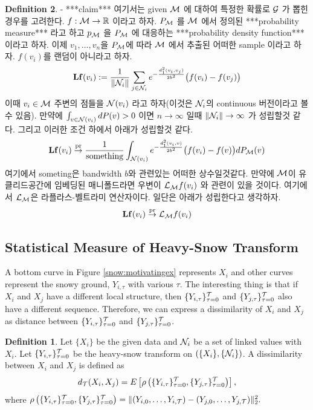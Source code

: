 \documentclass[preprint, review, 12pt]{article}
\theoremstyle{definition}
\newtheorem{dfn}{Definition}
\theoremstyle{remark}
\begin{document}
\begin{dfn}
- ***claim*** 여기서는 given ${\cal M}$ 에 대하여 특정한 확률로 ${\cal G}$ 가 뽑힌 경우를 고려한다. $f:{\cal M} \to \mathbb{R}$ 이라고 하자. $P_{\cal M}$ 를 ${\cal M}$ 에서 정의된 ***probability measure*** 라고 하고 $p_{\cal M}$ 을 $P_{\cal M}$ 에 대응하는 ***probability density function*** 이라고 하자. 이제 $v_1,\dots,v_n$을 $P_{\cal M}$에 따라 ${\cal M}$ 에서 추출된 어떠한 sample 이라고 하자. $f(v_i)$를  랜덤이 아니라고 하자. 
\begin{align}
{\bf Lf}(v_i):=\frac{1}{\|{\cal N}_ i\|}\sum_{j \in {\cal N}_ i} e^{ -\frac{d_1^2(v_i,v_j)}{2b^2} } \big(f(v_i)-f(v_j)\big)
\end{align}
이때 $v_i \in {\cal M}$ 주변의 점들을 ${\cal N}(v_i)$ 라고 하자(이것은 ${\cal N}_ i$의 continuous 버전이라고 볼 수 있음). 만약에 $\int_{v \in {\cal N}(v_i)} dP(v)>0$ 이면 $n \to \infty$ 일때 $\|{\cal N}_ i \| \to \infty$ 가 성립할것 같다.
그리고 이러한 조건 하에서 아래가 성립할것 같다. 
\begin{align}
{\bf Lf}(v_i) \overset{\operatorname{pr}}{\rightarrow}\frac{1}{\mbox{something} }\int_{ {\cal N}(v_i)} e^{ -\frac{d_1^2(v_i,v)}{2b^2} } \big(f(v_i)-f(v)\big)dP_{\cal M}(v)
\end{align}
여기에서 someting은 bandwidth $b$와 관련있는 어떠한 상수일것같다. 만약에 ${\cal M}$이 유클리드공간에 임베딩된 매니폴드라면 우변이 ${\cal L}_ {\cal M}f(v_i)$ 와 관련이 있을 것이다. 여기에서 ${\cal L}_ {\cal M}$은 라플라스-벨트라미 연산자이다. 일단은 아래가 성립한다고 생각하자. 
\begin{align}
{\bf Lf}(v_i) \overset{\operatorname{pr}}{\rightarrow} {\cal L}_ {\cal M}f(v_i)
\end{align}

\iffalse
\subsection{Statistical Measure of Heavy-Snow Transform}

A bottom curve in Figure \ref{snow:motivatingex} represents $X_i$ and other curves represent the snowy ground, $Y_{i,\tau}$ with various $\tau$. The interesting thing is that if $X_i$ and $X_j$ have a different local structure, then $\{Y_{i,\tau}\}_{\tau=0}^{\cal T}$ and $\{Y_{j,\tau}\}_{\tau=0}^{\cal T}$ also have a different sequence. Therefore, we can express a dissimilarity of $X_i$ and $X_j$ as distance between $\{Y_{i,\tau}\}_{\tau=0}^{\cal T}$ and $\{Y_{j,\tau}\}_{\tau=0}^{\cal T}$.

\begin{dfn}
	Let $\{X_i\}$ be the given data and ${\cal N}_{i}$ be a set of linked values with $X_i$. Let  $\{Y_{i,\tau}\}_{\tau=0}^{\cal T}$ be the heavy-snow transform on $(\{X_i\},\{{\cal N}_i\})$. A dissimilarity between $X_i$ and $X_j$ is defined as
	\[
	d_{\cal T}(X_i,X_j)=E\left[\rho\left(\{Y_{i,\tau}\}_{\tau=0}^{\cal T},\{Y_{j,\tau}\}_{\tau=0}^{\cal T}\right)\right], 
	\]
	where $\rho\left(\{Y_{i,\tau}\}_{\tau=0}^{\cal T},\{Y_{j,\tau}\}_{\tau=0}^{\cal T}\right)=\|(Y_{i,0},\dots,Y_{i,{\cal T}})-(Y_{j,0},\dots,Y_{j,{\cal T}}) \|_2^2.$
\end{dfn}


\end{dfn}
\end{document}
